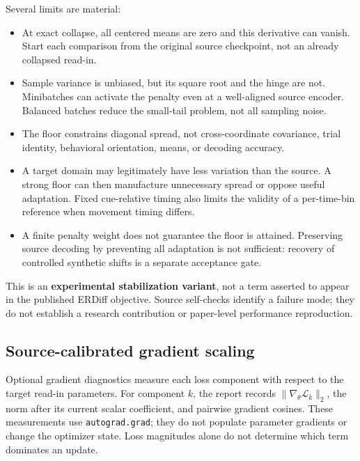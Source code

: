 \documentclass[11pt,a4paper]{article}
\begin{document}
Several limits are material:
\begin{itemize}
 \item At exact collapse, all centered means are zero and this derivative can
 vanish. Start each comparison from the original source checkpoint, not an
 already collapsed read-in.
 \item Sample variance is unbiased, but its square root and the hinge are not.
 Minibatches can activate the penalty even at a well-aligned source encoder.
 Balanced batches reduce the small-tail problem, not all sampling noise.
 \item The floor constrains diagonal spread, not cross-coordinate covariance,
 trial identity, behavioral orientation, means, or decoding accuracy.
 \item A target domain may legitimately have less variation than the source.
 A strong floor can then manufacture unnecessary spread or oppose useful
 adaptation. Fixed cue-relative timing also limits the validity of a
 per-time-bin reference when movement timing differs.
 \item A finite penalty weight does not guarantee the floor is attained.
 Preserving source decoding by preventing all adaptation is not sufficient:
 recovery of controlled synthetic shifts is a separate acceptance gate.
\end{itemize}

This is an \textbf{experimental stabilization variant}, not a term asserted
to appear in the published ERDiff objective. Source self-checks identify a
failure mode; they do not establish a research contribution or paper-level
performance reproduction.

\subsection{Source-calibrated gradient scaling}

Optional gradient diagnostics measure each loss component with respect to the
target read-in parameters. For component $k$, the report records
$\|\nabla_\theta \mathcal L_k\|_2$, the norm after its current scalar
coefficient, and pairwise gradient cosines. These measurements use
\texttt{autograd.grad}; they do not populate parameter gradients or change the
optimizer state. Loss magnitudes alone do not determine which term dominates
an update.
\end{document}
